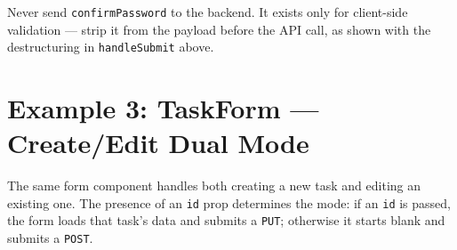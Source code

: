 \begin{warnbox}[WARNING]
Never send \texttt{confirmPassword} to the backend. It exists only for
client-side validation --- strip it from the payload before the API call, as
shown with the destructuring in \texttt{handleSubmit} above.
\end{warnbox}

\section{Example 3: TaskForm --- Create/Edit Dual Mode}

The same form component handles both creating a new task and editing an
existing one. The presence of an \texttt{id} prop determines the mode: if an
\texttt{id} is passed, the form loads that task's data and submits a
\texttt{PUT}; otherwise it starts blank and submits a \texttt{POST}.


